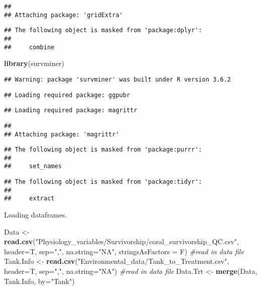 \documentclass[]{article}
\newenvironment{Shaded}{\begin{snugshade}}{\end{snugshade}}
\newcommand{\KeywordTok}[1]{\textcolor[rgb]{0.13,0.29,0.53}{\textbf{#1}}}
\newcommand{\DataTypeTok}[1]{\textcolor[rgb]{0.13,0.29,0.53}{#1}}
\newcommand{\StringTok}[1]{\textcolor[rgb]{0.31,0.60,0.02}{#1}}
\newcommand{\CommentTok}[1]{\textcolor[rgb]{0.56,0.35,0.01}{\textit{#1}}}
\newcommand{\NormalTok}[1]{#1}
\begin{document}
\begin{verbatim}
## 
## Attaching package: 'gridExtra'
\end{verbatim}

\begin{verbatim}
## The following object is masked from 'package:dplyr':
## 
##     combine
\end{verbatim}

\begin{Shaded}
\begin{Highlighting}[]
\KeywordTok{library}\NormalTok{(survminer)}
\end{Highlighting}
\end{Shaded}

\begin{verbatim}
## Warning: package 'survminer' was built under R version 3.6.2
\end{verbatim}

\begin{verbatim}
## Loading required package: ggpubr
\end{verbatim}

\begin{verbatim}
## Loading required package: magrittr
\end{verbatim}

\begin{verbatim}
## 
## Attaching package: 'magrittr'
\end{verbatim}

\begin{verbatim}
## The following object is masked from 'package:purrr':
## 
##     set_names
\end{verbatim}

\begin{verbatim}
## The following object is masked from 'package:tidyr':
## 
##     extract
\end{verbatim}

Loading dataframes.

\begin{Shaded}
\begin{Highlighting}[]
\NormalTok{Data <-}\StringTok{ }\KeywordTok{read.csv}\NormalTok{(}\StringTok{"Physiology_variables/Survivorship/coral_survivorship_QC.csv"}\NormalTok{, }\DataTypeTok{header=}\NormalTok{T, }\DataTypeTok{sep=}\StringTok{","}\NormalTok{, }\DataTypeTok{na.string=}\StringTok{"NA"}\NormalTok{, }\DataTypeTok{stringsAsFactors =}\NormalTok{ F) }\CommentTok{#read in data file}
\NormalTok{Tank.Info <-}\StringTok{ }\KeywordTok{read.csv}\NormalTok{(}\StringTok{"Environmental_data/Tank_to_Treatment.csv"}\NormalTok{, }\DataTypeTok{header=}\NormalTok{T, }\DataTypeTok{sep=}\StringTok{","}\NormalTok{, }\DataTypeTok{na.string=}\StringTok{"NA"}\NormalTok{) }\CommentTok{#read in data file }
\NormalTok{Data.Trt <-}\StringTok{ }\KeywordTok{merge}\NormalTok{(Data, Tank.Info, }\DataTypeTok{by=}\StringTok{"Tank"}\NormalTok{)}
\end{Highlighting}
\end{Shaded}
\end{document}
